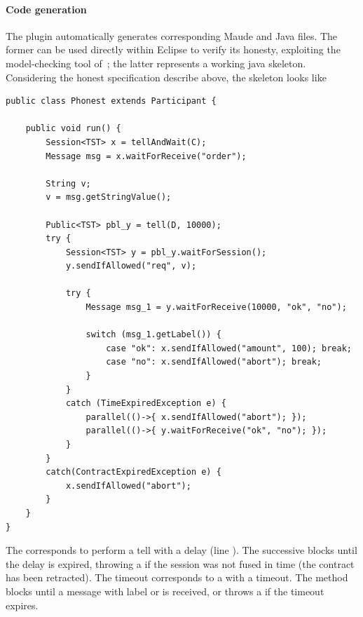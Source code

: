 \paragraph{Code generation}
The plugin automatically generates corresponding Maude and Java files.
The former can be used directly within Eclipse to verify its honesty,
exploiting the model-checking tool of~\cite{verifiable};
the latter represents a working java skeleton. 
Considering the honest specification describe above, the skeleton looks like
\begin{mdframed}
\begin{verbatim}
public class Phonest extends Participant {
            
    public void run() {
        Session<TST> x = tellAndWait(C);    
        Message msg = x.waitForReceive("order");
        
        String v;
        v = msg.getStringValue();
        
        Public<TST> pbl_y = tell(D, 10000);
        try {
            Session<TST> y = pbl_y.waitForSession();
            y.sendIfAllowed("req", v);
            
            try {
                Message msg_1 = y.waitForReceive(10000, "ok", "no");
                
                switch (msg_1.getLabel()) {                    
                    case "ok": x.sendIfAllowed("amount", 100); break;
                    case "no": x.sendIfAllowed("abort"); break;                    
                }
            }
            catch (TimeExpiredException e) {
                parallel(()->{ x.sendIfAllowed("abort"); });
                parallel(()->{ y.waitForReceive("ok", "no"); });
            }            
        }
        catch(ContractExpiredException e) {
            x.sendIfAllowed("abort");
        }
    }
}
\end{verbatim}
\end{mdframed}

The  corresponds to perform a tell with
a delay (line ). The successive  blocks until the delay is
expired, throwing a  if the session 
was not fused in time (the contract has been retracted).
The timeout  corresponds to a  with a timeout.
The method blocks until a message with label  or  is received,
or throws a  if the timeout expires.

